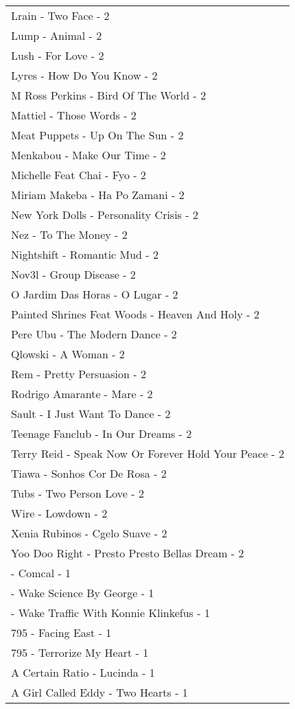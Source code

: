 \documentclass[
]{article}
\begin{document}
\begin{longtable}{l}
Lrain - Two Face - 2 \\ 
Lump - Animal - 2 \\ 
Lush - For Love - 2 \\ 
Lyres - How Do You Know - 2 \\ 
M Ross Perkins - Bird Of The World - 2 \\ 
Mattiel - Those Words - 2 \\ 
Meat Puppets - Up On The Sun - 2 \\ 
Menkabou - Make Our Time - 2 \\ 
Michelle Feat Chai - Fyo - 2 \\ 
Miriam Makeba - Ha Po Zamani - 2 \\ 
New York Dolls - Personality Crisis - 2 \\ 
Nez - To The Money - 2 \\ 
Nightshift - Romantic Mud - 2 \\ 
Nov3l - Group Disease - 2 \\ 
O Jardim Das Horas - O Lugar - 2 \\ 
Painted Shrines Feat Woods - Heaven And Holy - 2 \\ 
Pere Ubu - The Modern Dance - 2 \\ 
Qlowski - A Woman - 2 \\ 
Rem - Pretty Persuasion - 2 \\ 
Rodrigo Amarante - Mare - 2 \\ 
Sault - I Just Want To Dance - 2 \\ 
Teenage Fanclub - In Our Dreams - 2 \\ 
Terry Reid - Speak Now Or Forever Hold Your Peace - 2 \\ 
Tiawa - Sonhos Cor De Rosa - 2 \\ 
Tubs - Two Person Love - 2 \\ 
Wire - Lowdown - 2 \\ 
Xenia Rubinos - Cgelo Suave - 2 \\ 
Yoo Doo Right - Presto Presto Bellas Dream - 2 \\ 
 - Comcal - 1 \\ 
 - Wake Science By George - 1 \\ 
 - Wake Traffic With Konnie Klinkefus - 1 \\ 
795 - Facing East - 1 \\ 
795 - Terrorize My Heart - 1 \\ 
A Certain Ratio - Lucinda - 1 \\ 
A Girl Called Eddy - Two Hearts - 1 \\ 

\end{longtable}
\end{document}

